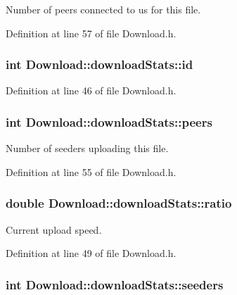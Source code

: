 Number of peers connected to us for this file. 



Definition at line 57 of file Download.h.

\hypertarget{structDownload_1_1downloadStats_a57f7994e7813d6d4705fd5081c9ed255}{
\subsubsection[{id}]{\setlength{\rightskip}{0pt plus 5cm}int {\bf Download::downloadStats::id}}}
\label{structDownload_1_1downloadStats_a57f7994e7813d6d4705fd5081c9ed255}


Definition at line 46 of file Download.h.

\hypertarget{structDownload_1_1downloadStats_a7b26668ee9f9a4233ebcb8ac9254ab29}{
\subsubsection[{peers}]{\setlength{\rightskip}{0pt plus 5cm}int {\bf Download::downloadStats::peers}}}
\label{structDownload_1_1downloadStats_a7b26668ee9f9a4233ebcb8ac9254ab29}


Number of seeders uploading this file. 



Definition at line 55 of file Download.h.

\hypertarget{structDownload_1_1downloadStats_a90933a4bec5ccd3682451495b240b71d}{
\subsubsection[{ratio}]{\setlength{\rightskip}{0pt plus 5cm}double {\bf Download::downloadStats::ratio}}}
\label{structDownload_1_1downloadStats_a90933a4bec5ccd3682451495b240b71d}


Current upload speed. 



Definition at line 49 of file Download.h.

\hypertarget{structDownload_1_1downloadStats_a9cef090f561bf611087b9cec57406a03}{
\subsubsection[{seeders}]{\setlength{\rightskip}{0pt plus 5cm}int {\bf Download::downloadStats::seeders}}}
\label{structDownload_1_1downloadStats_a9cef090f561bf611087b9cec57406a03}


